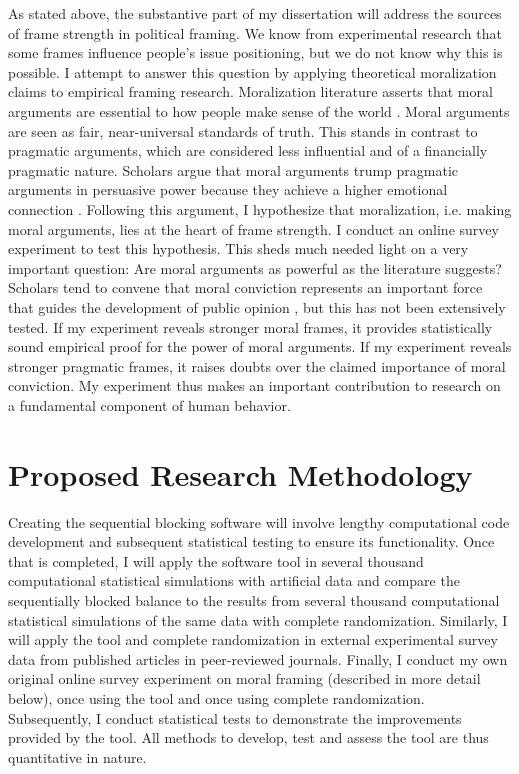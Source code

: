 \documentclass[11pt]{article}
\begin{document}
As stated above, the substantive part of my dissertation will address the sources of frame strength in political framing.  We know from experimental research that some frames influence people's issue positioning, but we do not know why this is possible. I attempt to answer this question by applying theoretical moralization claims to empirical framing research. Moralization literature asserts that moral arguments are essential to how people make sense of the world  \citep{mooney_public_2001}. Moral arguments are seen as fair, near-universal standards of truth. This stands in contrast to pragmatic arguments, which are considered less influential and of a financially pragmatic nature. Scholars argue that moral arguments trump pragmatic arguments in persuasive power because they achieve a higher emotional connection \citep{haidt_moral_2003}. Following this argument, I hypothesize that moralization, i.e. making moral arguments, lies at the heart of frame strength. I conduct an online survey experiment to test this hypothesis. This sheds much needed light on a very important question: Are moral arguments as powerful as the literature suggests? Scholars tend to convene that moral conviction represents an important force that guides the development of public opinion \citep{skitka_moral_2005,skitka_moral_2011}, but this has not been extensively tested. If my experiment reveals stronger moral frames, it provides statistically sound empirical proof for the power of moral arguments. If my experiment reveals stronger pragmatic frames, it raises doubts over the claimed importance of moral conviction. My experiment thus makes an important contribution to research on a fundamental component of human behavior.




\section*{Proposed Research Methodology}

\vspace{0.3cm}

Creating the sequential blocking software will involve lengthy computational code development and subsequent statistical testing to ensure its functionality. Once that is completed, I will apply the software tool in several thousand computational statistical simulations with artificial data and compare the sequentially blocked balance to the results from several thousand computational statistical simulations of the same data with complete randomization. Similarly, I will apply the tool and complete randomization in external experimental survey data from published articles in peer-reviewed journals. Finally, I conduct my own original online survey experiment on moral framing (described in more detail below), once using the tool and once using complete randomization. Subsequently, I conduct statistical tests to demonstrate the improvements provided by the tool. All methods to develop, test and assess the tool are thus quantitative in nature.
\end{document}
